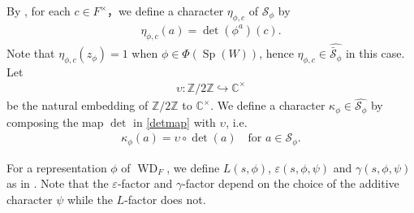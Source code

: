 \documentclass[article]{article}
\numberwithin{equation}{section}
\theoremstyle{definition}
\DeclareMathOperator{\WD}{WD}
\DeclareMathOperator{\SP}{Sp}
\begin{document}
By \cite[\S 4]{MR3202556}, for each $c \in F^{ \times}$，we define a character $\eta_{\phi,c}$ of $\mathcal {S}_{\phi}$ by
\begin{align}\label{eta}
\eta_{\phi,c}(a)=\det(\phi^{a})(c).
\end{align}
Note that $\eta_{\phi, c}(z_{\phi})=1$ when $\phi\in \Phi(\SP(W))$, hence $\eta_{\phi,c}\in \widehat{\bar{\mathcal S}_\phi}$ in this case. Let \begin{align*}
\upsilon: \mathbb Z/2\mathbb Z \hookrightarrow \mathbb C^{\times}
\end{align*} 
be the natural embedding of $\mathbb Z/2\mathbb Z$ to $\mathbb C^\times$. We define a character $\kappa_{\phi}\in \widehat {\mathcal {S}_{\phi}}$ by composing the map $\det$ in \ref{detmap} with $\upsilon$, i.e. 
\begin{align}\label{kappa}
\kappa_{\phi}(a)=\upsilon\circ \det(a)\quad \mbox{for}\,\,a\in \mathcal S_{\phi}. 
\end{align}
 

For a representation $\phi$ of $\WD_F$, we define $L(s,\phi)$, $\varepsilon(s,\phi,\psi)$ and $\gamma(s, \phi, \psi)$ as in \cite{MR546607}. Note that the $\varepsilon$-factor and $\gamma$-factor depend on the choice of the additive character $\psi$ while the $L$-factor does not. 
\end{document}
